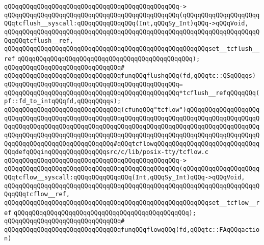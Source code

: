 \verb|qQQqqQQqqQQqqQQqqQQqqQQqqQQqqQQqqQQqqQQqqQQqqQQq->|\newline
\verb|qQQqqQQqqQQqqQQqqQQqqQQqqQQqqQQqqQQqqQQqqQQqqQQq(qQQqqQQqqQQqqQQqqQQqqQQqtcflush__syscall:qQQqqQQqqQQqqQQq(Int,qQQqSy_Int)qQQq->qQQqVoid,|\newline
\verb|qQQqqQQqqQQqqQQqqQQqqQQqqQQqqQQqqQQqqQQqqQQqqQQqqQQqqQQqqQQqqQQqqQQqqQQqqQQqtcflush__ref,|\newline
\verb|qQQqqQQqqQQqqQQqqQQqqQQqqQQqqQQqqQQqqQQqqQQqqQQqqQQqqQQqset__tcflush__ref|\newline
\verb|qQQqqQQqqQQqqQQqqQQqqQQqqQQqqQQqqQQqqQQqqQQqqQQq);|\newline
\verb|qQQqqQQqqQQqqQQqqQQqqQQqqQQqqQQq#|\newline
\verb|qQQqqQQqqQQqqQQqqQQqqQQqqQQqqQQqfunqQQqflushqQQq(fd,qQQqtc::QSqQQqqs)|\newline
\verb|qQQqqQQqqQQqqQQqqQQqqQQqqQQqqQQqqQQqqQQqqQQqqQQq=|\newline
\verb|qQQqqQQqqQQqqQQqqQQqqQQqqQQqqQQqqQQqqQQqqQQqqQQq*tcflush__refqQQqqQQq(pf::fd_to_intqQQqfd,qQQqqQQqqs);|\newline
\newline
\newline
\verb|qQQqqQQqqQQqqQQqqQQqqQQqqQQqqQQq(cfunqQQq"tcflow")qQQqqQQqqQQqqQQqqQQqqQQqqQQqqQQqqQQqqQQqqQQqqQQqqQQqqQQqqQQqqQQqqQQqqQQqqQQqqQQqqQQqqQQqqQQqqQQqqQQqqQQqqQQqqQQqqQQqqQQqqQQqqQQqqQQqqQQqqQQqqQQqqQQqqQQqqQQqqQQqqQQqqQQqqQQqqQQqqQQqqQQqqQQqqQQqqQQqqQQqqQQqqQQqqQQqqQQqqQQqqQQqqQQqqQQqqQQqqQQqqQQqqQQqqQQqqQQqqQQq#qQQqtcflowqQQqqQQqqQQqqQQqqQQqqQQqqQQqqQQqdefqQQqinqQQqqQQqqQQqqQQqsrc/c/lib/posix-tty/tcflow.c|\newline
\verb|qQQqqQQqqQQqqQQqqQQqqQQqqQQqqQQqqQQqqQQqqQQqqQQq->|\newline
\verb|qQQqqQQqqQQqqQQqqQQqqQQqqQQqqQQqqQQqqQQqqQQqqQQq(qQQqqQQqqQQqqQQqqQQqqQQqtcflow__syscall:qQQqqQQqqQQqqQQq(Int,qQQqSy_Int)qQQq->qQQqVoid,|\newline
\verb|qQQqqQQqqQQqqQQqqQQqqQQqqQQqqQQqqQQqqQQqqQQqqQQqqQQqqQQqqQQqqQQqqQQqqQQqqQQqtcflow__ref,|\newline
\verb|qQQqqQQqqQQqqQQqqQQqqQQqqQQqqQQqqQQqqQQqqQQqqQQqqQQqqQQqset__tcflow__ref|\newline
\verb|qQQqqQQqqQQqqQQqqQQqqQQqqQQqqQQqqQQqqQQqqQQqqQQq);|\newline
\verb|qQQqqQQqqQQqqQQqqQQqqQQqqQQqqQQq#|\newline
\verb|qQQqqQQqqQQqqQQqqQQqqQQqqQQqqQQqfunqQQqflowqQQq(fd,qQQqtc::FAqQQqaction)|\newline
